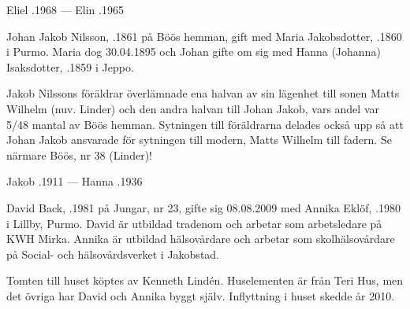 Eliel .1968  ---  Elin .1965


%
Johan Jakob Nilsson, .1861 på Böös hemman, gift med Maria 	Jakobsdotter, .1860 i Purmo. Maria dog 30.04.1895  och Johan gifte om sig med Hanna (Johanna) Isaksdotter, .1859 i Jeppo.
\begin{jhchildren}
  \item {}
  \item {}
  \item {}
  \item {}
  \item {}
  \item {}
  \item {}
  \item {}
\end{jhchildren}
Jakob Nilssons föräldrar överlämnade ena halvan av sin lägenhet	till sonen Matts Wilhelm (nuv. Linder) och den andra halvan till Johan Jakob, vars andel var 5/48 mantal av Böös hemman. Sytningen till föräldrarna delades också upp så att Johan Jakob ansvarade för sytningen till modern, Matts Wilhelm till fadern. Se närmare Böös, nr 38 (Linder)!

Jakob .1911  ---  Hanna .1936



%



%
David Back, .1981 på Jungar, nr 23, gifte sig 08.08.2009 med Annika Eklöf, .1980 i Lillby, Purmo. David är utbildad tradenom och arbetar som arbetsledare på KWH Mirka. Annika är	utbildad hälsovårdare och arbetar som skolhälsovårdare på Social- och hälsovårdsverket i Jakobstad.
\begin{jhchildren}
  \item {}
  \item {}
\end{jhchildren}
Tomten till huset köptes av Kenneth Lindén. Huselementen är från Teri Hus, men det övriga har David och Annika byggt själv. Inflyttning i huset skedde år 2010.



